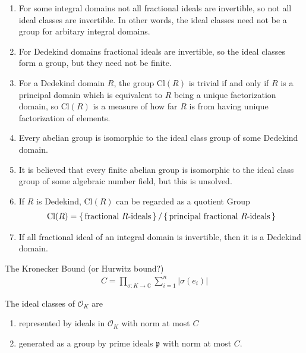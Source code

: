 \begin{rembox}
    \begin{remark}
        \begin{enumerate}
            \item For some integral domains not all fractional ideals are invertible, so not all ideal classes are invertible. In other words, the ideal classes need not be a group for arbitary integral domains.
            \item For Dedekind domains fractional ideals are invertible, so the ideal classes form a group, but they need not be finite.
            \item For a Dedekind domain \(R\), the group \(\mathrm{Cl}(R)\) is trivial if and only if \(R\) is a principal domain which is equivalent to \(R\) being a unique factorization domain, so \(\mathrm{Cl}(R)\) is a measure of how far \(R\) is from having unique factorization of elements.
            \item Every abelian group is isomorphic to the ideal class group of some Dedekind domain.
            \item It is believed that every finite abelian group is isomorphic to the ideal class group of some algebraic number field, but this is unsolved.
            \item If \(R\) is Dedekind, \(\mathrm{Cl}(R)\) can be regarded as a quotient Group
            \begin{align*}
                \mathrm{Cl}(R) = \left\{\, \text{fractional \(R\)-ideals} \,\right\} / \left\{\, \text{principal fractional \(R\)-ideals} \,\right\}
            \end{align*}
            \item If all fractional ideal of an integral domain is invertible, then it is a Dedekind domain.
        \end{enumerate}
    \end{remark}
\end{rembox}

\begin{defbox}
    \begin{definition}
        The Kronecker Bound (or Hurwitz bound?)
        \begin{align*}
            C = \prod_{\sigma: K \rightarrow \mathbb{C}} \sum_{i=1}^n |\sigma(e_i)|
        \end{align*}
    \end{definition}
\end{defbox}

\begin{thmbox}
    \begin{theorem}
        The ideal classes of \(\mathcal{O}_K\) are
        \begin{enumerate}
            \item represented by ideals in \(\mathcal{O}_K\) with norm at most \(C\)
            \item generated as a group by prime ideals \(\mathfrak{p}\) with norm at most \(C\).
        \end{enumerate}
    \end{theorem}
\end{thmbox}

